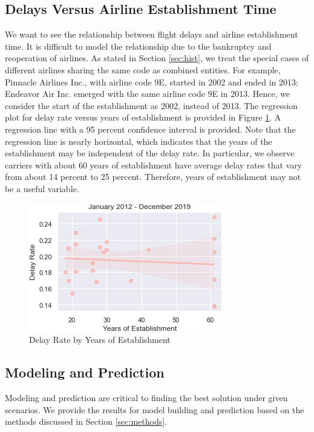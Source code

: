 \documentclass[11pt]{article}
\begin{document}
\subsection{Delays Versus Airline Establishment Time}\label{sec:estab}
We want to see the relationship between flight delays and airline establishment time. It is difficult to model the relationship due to the bankruptcy and reoperation of airlines. As stated in Section \ref{sec:hist}, we treat the special cases of different airlines sharing the same code as combined entities. For example, Pinnacle Airlines Inc., with airline code 9E, started in 2002 and ended in 2013; Endeavor Air Inc. emerged with the same airline code 9E in 2013. Hence, we consider the start of the establishment as 2002, instead of 2013. The regression plot for delay rate versus years of establishment is provided in Figure \ref{fig:reg_plot}. A regression line with a 95 percent confidence interval is provided. Note that the regression line is nearly horizontal, which indicates that the years of the establishment may be independent of the delay rate. In particular, we observe carriers with about 60 years of establishment have average delay rates that vary from about 14 percent to 25 percent. Therefore, years of establishment may not be a useful variable. 

\begin{figure}[h!]
\centering
\includegraphics[width = \columnwidth]{reg_plot}
\caption{Delay Rate by Years of Establishment}\label{fig:reg_plot}
\end{figure}

\subsection{Modeling and Prediction}
Modeling and prediction are critical to finding the best solution under given scenarios. We provide the results for model building and prediction based on the methods discussed in Section \ref{sec:methods}.
\end{document}
